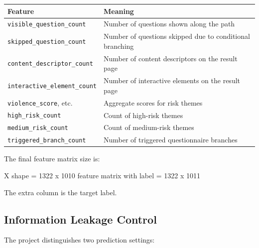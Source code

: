 \documentclass[UTF8,a4paper,12pt]{ctexart}
\newenvironment{Shaded}{\begin{snugshade}}{\end{snugshade}}
\newcommand{\NormalTok}[1]{#1}
\renewenvironment{Shaded}{%
    \vspace{0.35em}%
    \begin{tcolorbox}[enhanced,breakable,colback=zjucodebg,colframe=zjucodeframe,boxrule=0.45pt,leftrule=2.2pt,arc=1.6mm,left=1.8mm,right=1.8mm,top=1.2mm,bottom=1.2mm]%
  }{%
    \end{tcolorbox}%
    \vspace{0.25em}%
  }%
\newcounter{none}
\begin{document}
{\def\LTcaptype{none} %
\begin{longtable}[]{@{}
  >{\raggedright\arraybackslash}p{}
  >{\raggedright\arraybackslash}p{}@{}}
\toprule\noalign{}
\begin{minipage}[b]{\linewidth}\raggedright
Feature
\end{minipage} & \begin{minipage}[b]{\linewidth}\raggedright
Meaning
\end{minipage} \\
\midrule\noalign{}
\endhead
\bottomrule\noalign{}
\endlastfoot
\texttt{visible\_question\_count} & Number of questions shown along the path \\
\texttt{skipped\_question\_count} & Number of questions skipped due to conditional branching \\
\texttt{content\_descriptor\_count} & Number of content descriptors on the result page \\
\texttt{interactive\_element\_count} & Number of interactive elements on the result page \\
\texttt{violence\_score}, etc. & Aggregate scores for risk themes \\
\texttt{high\_risk\_count} & Count of high-risk themes \\
\texttt{medium\_risk\_count} & Count of medium-risk themes \\
\texttt{triggered\_branch\_count} & Number of triggered questionnaire branches \\
\end{longtable}
}

The final feature matrix size is:

\begin{Shaded}
\begin{Highlighting}[]
\NormalTok{X shape = 1322 x 1010}
\NormalTok{feature matrix with label = 1322 x 1011}
\end{Highlighting}
\end{Shaded}

The extra column is the target label.

\subsection{Information Leakage Control}\label{information-leakage-control}

The project distinguishes two prediction settings:
\end{document}
